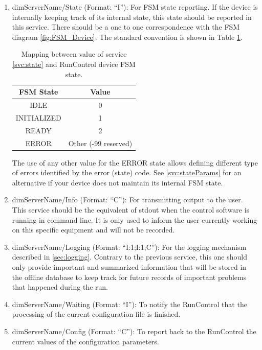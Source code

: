 \documentclass[a4paper]{article}
\begin{document}
\begin{enumerate}[label=\textbf{SVC.\arabic*}]
	\item \label{svc:state} dimServerName/State (Format: ``I''): For FSM state reporting. If the device
	is internally keeping track of its internal state, this state should be reported in this service. There should
	be a one to one correspondence with the FSM diagram \ref{fig:FSM_Device}. The standard convention
	is shown in Table \ref{table:FSMStates}.
	\begin{table}
		\center
		\begin{tabular}{c|c}
			FSM State & Value\\
			\hline
			IDLE & 0\\
			INITIALIZED & 1\\
			READY & 2\\
			ERROR & Other (-99 reserved)\\
			\hline
		\end{tabular}
		\caption{Mapping between value of service \ref{svc:state} and RunControl device FSM state.}
		\label{table:FSMStates}
	\end{table}
	The use of any other value for the ERROR state allows defining different type of errors identified
	by the error (state) code. See \ref{svc:stateParams} for an alternative if your device does not
	maintain its internal FSM state.
	\item \label{svc:info} dimServerName/Info (Format: ``C''): For transmitting output to the user. This
	service should be the equivalent of stdout when the control software is running in command line. It is only used
	to inform the user currently working on this specific equipment and will not be recorded.
	\item \label{svc:logging} dimServerName/Logging (Format: ``I:1;I:1;C''): For the logging mechanism
	described in \ref{sec:logging}. Contrary to the previous service, this one should only provide important and
	summarized information that will be stored in the offline database to keep track for future records
	of important problems that happened during the run.
	\item \label{svc:waiting} dimServerName/Waiting (Format: ``I''): To notify the RunControl that the
	processing of the current configuration file is finished.
	\item \label{svc:config} dimServerName/Config (Format: ``C''): To report back to the RunControl the
	current values of the configuration parameters.
\end{enumerate}
\end{document}
